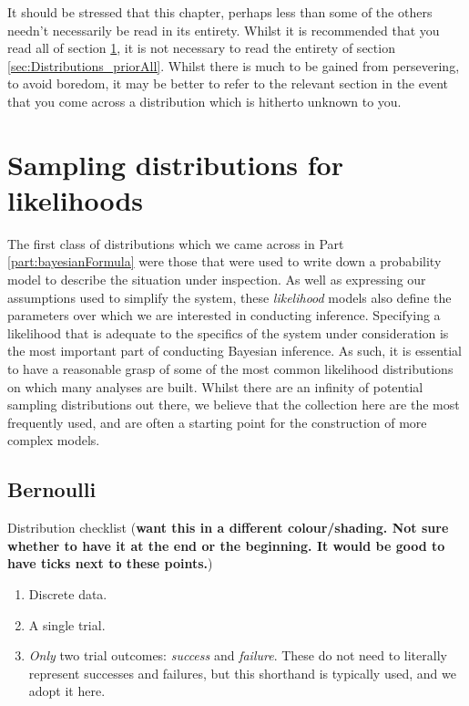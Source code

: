 \documentclass[11pt,fullpage]{book}
\begin{document}
It should be stressed that this chapter, perhaps less than some of the others needn't necessarily be read in its entirety. Whilst it is recommended that you read all of section \ref{sec:Distributions_samplingDist}, it is not necessary to read the entirety of section \ref{sec:Distributions_priorAll}. Whilst there is much to be gained from persevering, to avoid boredom, it may be better to refer to the relevant section in the event that you come across a distribution which is hitherto unknown to you.

\section{Sampling distributions for likelihoods}\label{sec:Distributions_samplingDist}
The first class of distributions which we came across in Part \ref{part:bayesianFormula} were those that were used to write down a probability model to describe the situation under inspection. As well as expressing our assumptions used to simplify the system, these \textit{likelihood} models also define the parameters over which we are interested in conducting inference. Specifying a likelihood that is adequate to the specifics of the system under consideration is the most important part of conducting Bayesian inference. As such, it is essential to have a reasonable grasp of some of the most common likelihood distributions on which many analyses are built. Whilst there are an infinity of potential sampling distributions out there, we believe that the collection here are the most frequently used, and are often a starting point for the construction of more complex models.

\subsection{Bernoulli}\label{sec:Distributions_bernoulli}

Distribution checklist (\textbf{want this in a different colour/shading. Not sure whether to have it at the end or the beginning. It would be good to have ticks next to these points.})

\begin{enumerate}
\item Discrete data.
\item A single trial.
\item \textit{Only} two trial outcomes: \textit{success} and \textit{failure}. These do not need to literally represent successes and failures, but this shorthand is typically used, and we adopt it here.
\end{enumerate}
\end{document}

